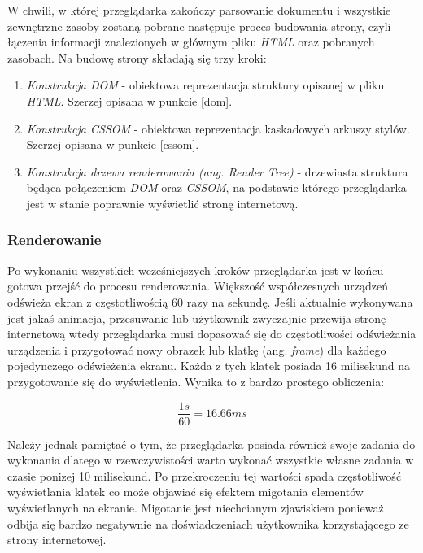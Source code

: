 \documentclass[polish, twoside, 12pt]{mwart}
\begin{document}
W chwili, w której przeglądarka zakończy parsowanie dokumentu i wszystkie zewnętrzne zasoby zostaną pobrane następuje proces budowania strony, czyli łączenia informacji znalezionych w głównym pliku \emph{HTML} oraz pobranych zasobach. Na budowę strony składają się trzy kroki:

\begin{enumerate}
  \item \emph{Konstrukcja DOM} - obiektowa reprezentacja struktury opisanej w pliku \emph{HTML}. Szerzej opisana w punkcie \ref{dom}.
  \item \emph{Konstrukcja CSSOM} - obiektowa reprezentacja kaskadowych arkuszy stylów. Szerzej opisana w punkcie \ref{cssom}.
  \item \emph{Konstrukcja drzewa renderowania (ang. Render Tree)} - drzewiasta struktura będąca połączeniem \emph{DOM} oraz \emph{CSSOM}, na podstawie którego przeglądarka jest w stanie poprawnie wyświetlić stronę internetową.
\end{enumerate}

\subsubsection{Renderowanie}

Po wykonaniu wszystkich wcześniejszych kroków przeglądarka jest w końcu gotowa przejść do procesu renderowania. Większość współczesnych urządzeń odświeża ekran z częstotliwością 60 razy na sekundę. Jeśli aktualnie wykonywana jest jakaś animacja, przesuwanie lub użytkownik zwyczajnie przewija stronę internetową wtedy przeglądarka musi dopasować się do częstotliwości odświeżania urządzenia i przygotować nowy obrazek lub klatkę (ang. \emph{frame}) dla każdego pojedynczego odświeżenia ekranu. Każda z tych klatek posiada 16 milisekund na przygotowanie się do wyświetlenia. Wynika to z bardzo prostego obliczenia:

\begin{equation}
  \frac{1s}{60} = 16.66 ms
\end{equation}

Należy jednak pamiętać o tym, że przeglądarka posiada również swoje zadania do wykonania dlatego w rzewczywistości warto wykonać wszystkie własne zadania w czasie ponizej 10 milisekund. Po przekroczeniu tej wartości spada częstotliwość wyświetlania klatek co może objawiać się efektem migotania elementów wyświetlanych na ekranie. Migotanie jest niechcianym zjawiskiem ponieważ odbija się bardzo negatywnie na doświadczeniach użytkownika korzystającego ze strony internetowej.
\end{document}
